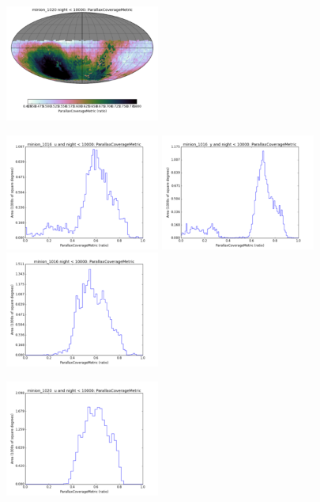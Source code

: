 \begin{figure}[ht]
\begin{center}
  \includegraphics[width=2.0in]{./figs/milkyway/astromPanels/MW_Astrom_paCovge_PanSTARRS_10y_map.png}
  \end{center}

  \begin{center}
  \includegraphics[width=2.0in]{./figs/milkyway/astromPanels/MW_Astrom_paCovge_Baseline_u_hst.png}
  \includegraphics[width=2.0in]{./figs/milkyway/astromPanels/MW_Astrom_paCovge_Baseline_y_hst.png}
  \includegraphics[width=2.0in]{./figs/milkyway/astromPanels/MW_Astrom_paCovge_Baseline_10y_hst.png}
  \end{center}
  \begin{center}
  \includegraphics[width=2.0in]{./figs/milkyway/astromPanels/MW_Astrom_paCovge_PanSTARRS_u_hst.png}

\end{center}
\end{figure}
